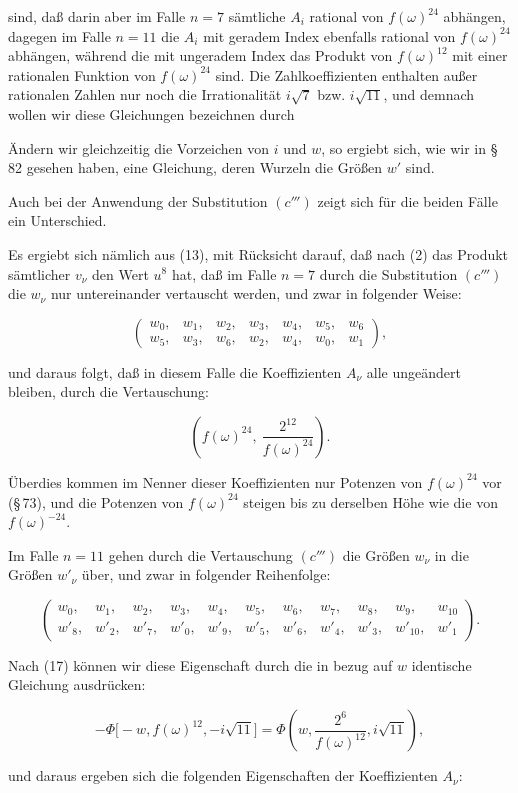 sind, daß darin aber im Falle $n = 7$ sämtliche $A_i$ rational von $f(\omega)^{24}$ abhängen, dagegen im Falle $n = 11$ die $A_i$ mit geradem Index ebenfalls rational von $f(\omega)^{24}$ abhängen, während die mit ungeradem Index das Produkt von $f(\omega)^{12}$ mit einer rationalen Funktion von $f(\omega)^{24}$ sind. Die Zahlkoeffizienten enthalten außer rationalen Zahlen nur noch die Irrationalität $i\sqrt{7}$ bzw. $i\sqrt{11}$, und demnach wollen wir diese Gleichungen bezeichnen durch


Ändern wir gleichzeitig die Vorzeichen von $i$ und $w$, so ergiebt sich, wie wir in \S\,82 gesehen haben, eine Gleichung, deren Wurzeln die Größen $w'$ sind.

Auch bei der Anwendung der Substitution $(c''')$ zeigt sich für die beiden Fälle ein Unterschied.

Es ergiebt sich nämlich aus (13), mit Rücksicht darauf, daß nach (2) das Produkt sämtlicher $v_\nu$ den Wert $u^8$ hat, daß im Falle $n = 7$ durch die Substitution $(c''')$ die $w_\nu$ nur untereinander vertauscht werden, und zwar in folgender Weise:

\[
\begin{pmatrix} w_0, & w_1, & w_2, & w_3, & w_4, & w_5, & w_6\\ w_5, & w_3, & w_6, & w_2, & w_4, & w_0, & w_1 \end{pmatrix},
\]

und daraus folgt, daß in diesem Falle die Koeffizienten $A_\nu$ alle ungeändert bleiben, durch die Vertauschung:

\[
\left(f(\omega)^{24},\ \frac{2^{12}}{f(\omega)^{24}}\right).
\]

Überdies kommen im Nenner dieser Koeffizienten nur Potenzen von $f(\omega)^{24}$ vor (\S\,73), und die Potenzen von $f(\omega)^{24}$ steigen bis zu derselben Höhe wie die von $f(\omega)^{-24}$.

Im Falle $n = 11$ gehen durch die Vertauschung $(c''')$ die Größen $w_\nu$ in die Größen $w'_\nu$ über, und zwar in folgender Reihenfolge:

\[
\begin{pmatrix} w_0, & w_1, & w_2, & w_3, & w_4, & w_5, & w_6, & w_7, & w_8, & w_9, & w_{10}\\ w'_8, & w'_2, & w'_7, & w'_0, & w'_9, & w'_5, & w'_6, & w'_4, & w'_3, & w'_{10}, & w'_1 \end{pmatrix}.
\]

Nach (17) können wir diese Eigenschaft durch die in bezug auf $w$ identische Gleichung ausdrücken:

\[
-\Phi\bigl[-w, f(\omega)^{12}, -i\sqrt{11}\bigr] = \Phi\!\left(w, \frac{2^6}{f(\omega)^{12}}, i\sqrt{11}\right),
\]

und daraus ergeben sich die folgenden Eigenschaften der Koeffizienten $A_\nu$:
